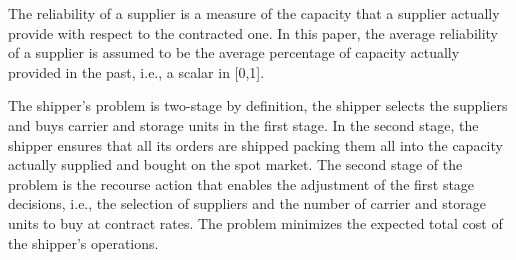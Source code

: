 \documentclass[a4paper,11pt]{article}
\begin{document}
	The reliability of a supplier is a measure of the capacity that a supplier actually provide with respect to the contracted one.
	In this paper, the average reliability of a supplier is assumed to be the average percentage of capacity actually provided in the past, i.e., a scalar in [0,1].

	The shipper's problem is two-stage by definition, the shipper selects the suppliers and buys carrier and storage units in the first stage.
	In the second stage, the shipper ensures that all its orders are shipped packing them all into the capacity actually supplied and bought on the spot market.
	The second stage of the problem is the recourse action that enables the adjustment of the first stage decisions, i.e., the selection of suppliers and the number of carrier and storage units to buy at contract rates.
	The problem minimizes the expected total cost of the shipper's operations.
	
\end{document}
